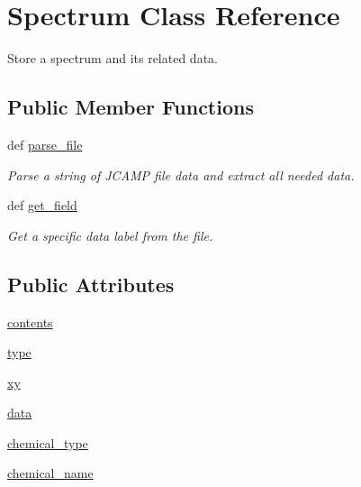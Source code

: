 \hypertarget{classbackend_1_1_spectrum}{
\section{Spectrum Class Reference}
\label{classbackend_1_1_spectrum}
}


Store a spectrum and its related data.  


\subsection*{Public Member Functions}
\begin{DoxyCompactItemize}
\item 
def \hyperlink{classbackend_1_1_spectrum_a14401ccceaf67f005506de0a8320b089}{parse\_\-file}
\begin{DoxyCompactList}\small\item\em Parse a string of JCAMP file data and extract all needed data. \item\end{DoxyCompactList}\item 
def \hyperlink{classbackend_1_1_spectrum_af50426ecd14fc9667344dbf5407fb487}{get\_\-field}
\begin{DoxyCompactList}\small\item\em Get a specific data label from the file. \item\end{DoxyCompactList}\end{DoxyCompactItemize}
\subsection*{Public Attributes}
\begin{DoxyCompactItemize}
\item 
\hyperlink{classbackend_1_1_spectrum_aa6082c83a20a90e5a2ab9f216961972f}{contents}
\item 
\hyperlink{classbackend_1_1_spectrum_a7aead736a07eaf25623ad7bfa1f0ee2d}{type}
\item 
\hyperlink{classbackend_1_1_spectrum_a3f6f55ba521257932bb08684e0181fa1}{xy}
\item 
\hyperlink{classbackend_1_1_spectrum_a511ae0b1c13f95e5f08f1a0dd3da3d93}{data}
\item 
\hyperlink{classbackend_1_1_spectrum_ab23a1bfe0956557e254961031d578c23}{chemical\_\-type}
\item 
\hyperlink{classbackend_1_1_spectrum_a77c112c599aae1eeb8d54936bb435177}{chemical\_\-name}
\end{DoxyCompactItemize}
